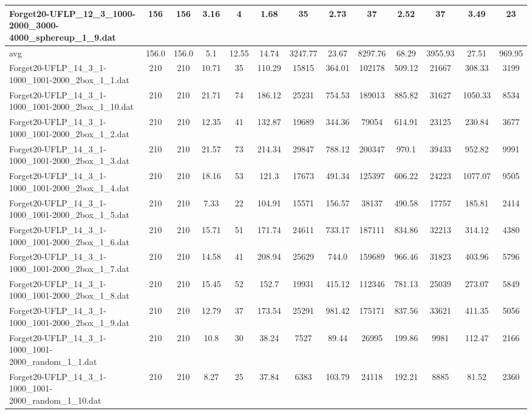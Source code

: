 \begin{table}[!ht]
{\begin{tabular}{lcccccccccccc}
Forget20-UFLP\_12\_3\_1000-2000\_3000-4000\_sphereup\_1\_9.dat & 156 & 156 & 3.16 & 4 & 1.68 & 35 & 2.73 & 37 & 2.52 & 37 & 3.49 & 23 \\
\hline avg & 156.0 & 156.0 & 5.1& 12.55 & 14.74& 3247.77 & 23.67& 8297.76 & 68.29& 3955.93 & 27.51& 969.95\\ \hline
Forget20-UFLP\_14\_3\_1-1000\_1001-2000\_2box\_1\_1.dat & 210 & 210 & 10.71 & 35 & 110.29 & 15815 & 364.01 & 102178 & 509.12 & 21667 & 308.33 & 3199 \\
Forget20-UFLP\_14\_3\_1-1000\_1001-2000\_2box\_1\_10.dat & 210 & 210 & 21.71 & 74 & 186.12 & 25231 & 754.53 & 189013 & 885.82 & 31627 & 1050.33 & 8534 \\
Forget20-UFLP\_14\_3\_1-1000\_1001-2000\_2box\_1\_2.dat & 210 & 210 & 12.35 & 41 & 132.87 & 19689 & 344.36 & 79054 & 614.91 & 23125 & 230.84 & 3677 \\
Forget20-UFLP\_14\_3\_1-1000\_1001-2000\_2box\_1\_3.dat & 210 & 210 & 21.57 & 73 & 214.34 & 29847 & 788.12 & 200347 & 970.1 & 39433 & 952.82 & 9991 \\
Forget20-UFLP\_14\_3\_1-1000\_1001-2000\_2box\_1\_4.dat & 210 & 210 & 18.16 & 53 & 121.3 & 17673 & 491.34 & 125397 & 606.22 & 24223 & 1077.07 & 9505 \\
Forget20-UFLP\_14\_3\_1-1000\_1001-2000\_2box\_1\_5.dat & 210 & 210 & 7.33 & 22 & 104.91 & 15571 & 156.57 & 38137 & 490.58 & 17757 & 185.81 & 2414 \\
Forget20-UFLP\_14\_3\_1-1000\_1001-2000\_2box\_1\_6.dat & 210 & 210 & 15.71 & 51 & 171.74 & 24611 & 733.17 & 187111 & 834.86 & 32213 & 314.12 & 4380 \\
Forget20-UFLP\_14\_3\_1-1000\_1001-2000\_2box\_1\_7.dat & 210 & 210 & 14.58 & 41 & 208.94 & 25629 & 744.0 & 159689 & 966.46 & 31823 & 403.96 & 5796 \\
Forget20-UFLP\_14\_3\_1-1000\_1001-2000\_2box\_1\_8.dat & 210 & 210 & 15.45 & 52 & 152.7 & 19931 & 415.12 & 112346 & 781.13 & 25039 & 273.07 & 5849 \\
Forget20-UFLP\_14\_3\_1-1000\_1001-2000\_2box\_1\_9.dat & 210 & 210 & 12.79 & 37 & 173.54 & 25291 & 981.42 & 175171 & 837.56 & 33621 & 411.35 & 5056 \\
Forget20-UFLP\_14\_3\_1-1000\_1001-2000\_random\_1\_1.dat & 210 & 210 & 10.8 & 30 & 38.24 & 7527 & 89.44 & 26995 & 199.86 & 9981 & 112.47 & 2166 \\
Forget20-UFLP\_14\_3\_1-1000\_1001-2000\_random\_1\_10.dat & 210 & 210 & 8.27 & 25 & 37.84 & 6383 & 103.79 & 24118 & 192.21 & 8885 & 81.52 & 2360 \\

\end{tabular}}
\end{table}
